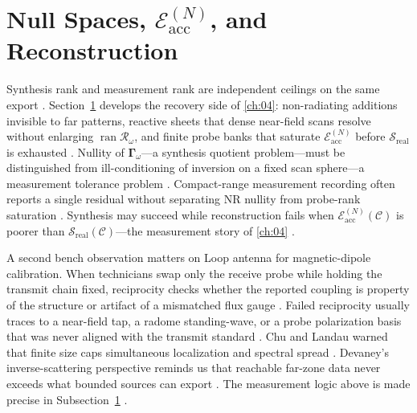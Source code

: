 \section{Null Spaces, $\mathcal{E}_{\mathrm{acc}}^{(N)}$, and Reconstruction}
\label{sec:ch47}
Synthesis rank and measurement rank are independent ceilings on the same export \cite{devaney2004}. Section~\ref{sec:ch47} develops the recovery side of \ref{ch:04}: non-radiating additions invisible to far patterns, reactive sheets that dense near-field scans resolve without enlarging $\operatorname{ran}\mathcal{R}_\omega$, and finite probe banks that saturate $\mathcal{E}_{\mathrm{acc}}^{(N)}$ before $\mathcal{S}_{\mathrm{real}}$ is exhausted \cite{stratton1941}. Nullity of $\boldsymbol{\Gamma}_\omega$---a synthesis quotient problem---must be distinguished from ill-conditioning of inversion on a fixed scan sphere---a measurement tolerance problem \cite{harrington2001}. Compact-range measurement recording often reports a single residual without separating NR nullity from probe-rank saturation \cite{hansen1988}.
Synthesis may succeed while reconstruction fails when $\mathcal{E}_{\mathrm{acc}}^{(N)}(\mathcal{C})$ is poorer than $\mathcal{S}_{\mathrm{real}}(\mathcal{C})$---the measurement story of \ref{ch:04} \cite{devaney2004}.
\begin{physicalvignette}
A second bench observation matters on Loop antenna for magnetic-dipole calibration. When technicians swap only the receive probe while holding the transmit chain fixed, reciprocity checks whether the reported coupling is property of the structure or artifact of a mismatched flux gauge \cite{stratton1941}. Failed reciprocity usually traces to a near-field tap, a radome standing-wave, or a probe polarization basis that was never aligned with the transmit standard \cite{hansen1988}.
Chu and Landau warned that finite size caps simultaneous localization and spectral spread \cite{chu1948}. Devaney's inverse-scattering perspective reminds us that reachable far-zone data never exceeds what bounded sources can export \cite{devaney2004}.
The measurement logic above is made precise in Subsection~\ref{sec:ch47} \cite{stratton1941}.
\end{physicalvignette}
